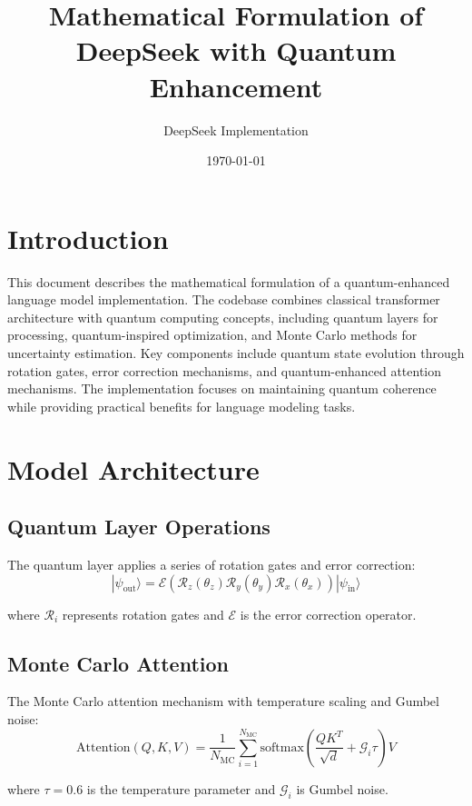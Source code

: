 \documentclass{article}
\title{Mathematical Formulation of DeepSeek with Quantum Enhancement}
\author{DeepSeek Implementation}
\date{\today}
\begin{document}
\maketitle

\section*{Introduction}
This document describes the mathematical formulation of a quantum-enhanced language model implementation. The codebase combines classical transformer architecture with quantum computing concepts, including quantum layers for processing, quantum-inspired optimization, and Monte Carlo methods for uncertainty estimation. Key components include quantum state evolution through rotation gates, error correction mechanisms, and quantum-enhanced attention mechanisms. The implementation focuses on maintaining quantum coherence while providing practical benefits for language modeling tasks.

\section{Model Architecture}

\subsection{Quantum Layer Operations}
The quantum layer applies a series of rotation gates and error correction:
\begin{equation}
|\psi_{\text{out}}\rangle = \mathcal{E}(\mathcal{R}_z(\theta_z)\mathcal{R}_y(\theta_y)\mathcal{R}_x(\theta_x))|\psi_{\text{in}}\rangle
\end{equation}

where $\mathcal{R}_i$ represents rotation gates and $\mathcal{E}$ is the error correction operator.

\subsection{Monte Carlo Attention}
The Monte Carlo attention mechanism with temperature scaling and Gumbel noise:
\begin{equation}
\text{Attention}(Q,K,V) = \frac{1}{N_{\text{MC}}}\sum_{i=1}^{N_{\text{MC}}} \text{softmax}\left(\frac{QK^T}{\sqrt{d}} + \mathcal{G}_i\tau\right)V
\end{equation}

where $\tau=0.6$ is the temperature parameter and $\mathcal{G}_i$ is Gumbel noise.
\end{document}
